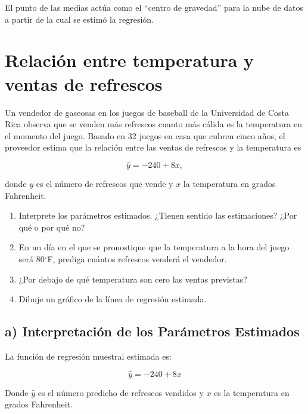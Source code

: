 \documentclass[12pt]{article}
\begin{document}
El punto de las medias actúa como el ``centro de gravedad'' para la nube de datos a partir de la cual se estimó la regresión.

\newpage
\section{Relación entre temperatura y ventas de refrescos}

Un vendedor de gaseosas en los juegos de baseball de la Universidad de Costa Rica observa que se venden más refrescos cuanto más cálida es la temperatura en el momento del juego. Basado en 32 juegos en casa que cubren cinco años, el proveedor estima que la relación entre las ventas de refrescos y la temperatura es

\[
\hat{y} = -240 + 8x,
\]

donde $y$ es el número de refrescos que vende y $x$ la temperatura en grados Fahrenheit.

\begin{enumerate}[label=\alph*)]
    \item Interprete los parámetros estimados. ¿Tienen sentido las estimaciones? ¿Por qué o por qué no?
    \item En un día en el que se pronostique que la temperatura a la hora del juego será 80$^\circ$F, prediga cuántos refrescos venderá el vendedor.
    \item ¿Por debajo de qué temperatura son cero las ventas previstas?
    \item Dibuje un gráfico de la línea de regresión estimada.
\end{enumerate}

\subsection*{a) Interpretación de los Parámetros Estimados}

La función de regresión muestral estimada es:  

\[
\hat{y} = -240 + 8x
\]

Donde $\hat{y}$ es el número predicho de refrescos vendidos y $x$ es la temperatura en grados Fahrenheit.  
\end{document}
